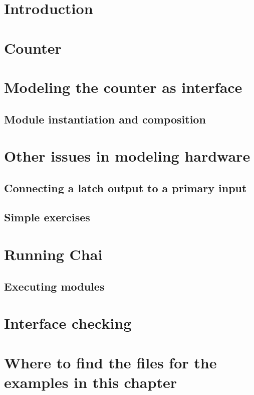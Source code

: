 \label{chap:chaitut}
\section{Introduction}
\section{Counter}
\section{Modeling the counter as interface}
\subsection{Module instantiation and composition}
\section{Other issues in modeling hardware}
\subsection{Connecting a latch output to a primary input}
\subsection{Simple exercises}
\section{Running Chai}
\subsection{Executing modules}
\section{Interface checking}
\section{Where to find the files for the examples in this chapter}
